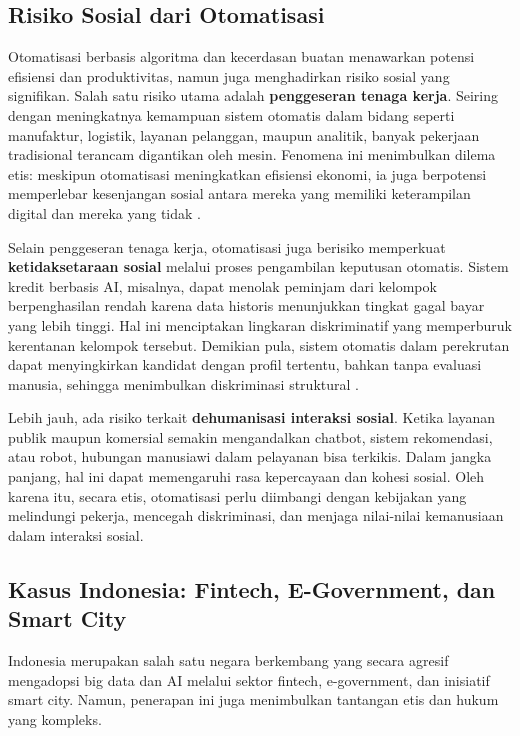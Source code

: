 \subsection{Risiko Sosial dari Otomatisasi}

Otomatisasi berbasis algoritma dan kecerdasan buatan menawarkan potensi efisiensi dan produktivitas, namun juga menghadirkan risiko sosial yang signifikan. Salah satu risiko utama adalah \textbf{penggeseran tenaga kerja}. Seiring dengan meningkatnya kemampuan sistem otomatis dalam bidang seperti manufaktur, logistik, layanan pelanggan, maupun analitik, banyak pekerjaan tradisional terancam digantikan oleh mesin. Fenomena ini menimbulkan dilema etis: meskipun otomatisasi meningkatkan efisiensi ekonomi, ia juga berpotensi memperlebar kesenjangan sosial antara mereka yang memiliki keterampilan digital dan mereka yang tidak \cite{brynjolfsson2014second}.  

Selain penggeseran tenaga kerja, otomatisasi juga berisiko memperkuat \textbf{ketidaksetaraan sosial} melalui proses pengambilan keputusan otomatis. Sistem kredit berbasis AI, misalnya, dapat menolak peminjam dari kelompok berpenghasilan rendah karena data historis menunjukkan tingkat gagal bayar yang lebih tinggi. Hal ini menciptakan lingkaran diskriminatif yang memperburuk kerentanan kelompok tersebut. Demikian pula, sistem otomatis dalam perekrutan dapat menyingkirkan kandidat dengan profil tertentu, bahkan tanpa evaluasi manusia, sehingga menimbulkan diskriminasi struktural \cite{egan2017algorithms}.  

Lebih jauh, ada risiko terkait \textbf{dehumanisasi interaksi sosial}. Ketika layanan publik maupun komersial semakin mengandalkan chatbot, sistem rekomendasi, atau robot, hubungan manusiawi dalam pelayanan bisa terkikis. Dalam jangka panjang, hal ini dapat memengaruhi rasa kepercayaan dan kohesi sosial. Oleh karena itu, secara etis, otomatisasi perlu diimbangi dengan kebijakan yang melindungi pekerja, mencegah diskriminasi, dan menjaga nilai-nilai kemanusiaan dalam interaksi sosial.

\subsection{Kasus Indonesia: Fintech, E-Government, dan Smart City}

Indonesia merupakan salah satu negara berkembang yang secara agresif mengadopsi big data dan AI melalui sektor fintech, e-government, dan inisiatif smart city. Namun, penerapan ini juga menimbulkan tantangan etis dan hukum yang kompleks.

